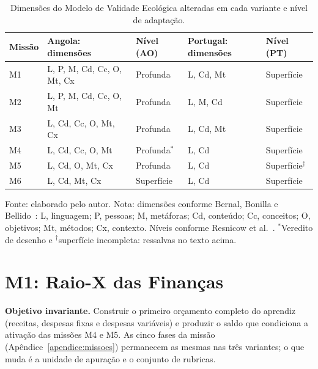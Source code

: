 \begin{table}[htbp]
\centering
\small
\caption[Vereditos de adaptação por missão]{Dimensões do Modelo de Validade Ecológica alteradas em cada variante e nível de adaptação.}
\label{tab:variantes_veredito}
\setlength{\tabcolsep}{4pt}
\begin{tabular}{lllll}
\hline
\textbf{Missão} & \textbf{Angola: dimensões} & \textbf{Nível (AO)} & \textbf{Portugal: dimensões} & \textbf{Nível (PT)} \\
\hline
M1 & L, P, M, Cd, Cc, O, Mt, Cx & Profunda & L, Cd, Mt & Superfície \\
M2 & L, P, M, Cd, Cc, O, Mt & Profunda & L, M, Cd & Superfície \\
M3 & L, Cd, Cc, O, Mt, Cx & Profunda & L, Cd, Mt & Superfície \\
M4 & L, Cd, Cc, O, Mt & Profunda$^{*}$ & L, Cd & Superfície \\
M5 & L, Cd, O, Mt, Cx & Profunda & L, Cd & Superfície$^{\dagger}$ \\
M6 & L, Cd, Mt, Cx & Superfície & L, Cd & Superfície \\
\hline
\end{tabular}

\begin{minipage}{0.92\textwidth}
{\footnotesize Fonte: elaborado pelo autor. Nota: dimensões conforme Bernal, Bonilla e Bellido~\cite{bernal1995}: L, linguagem; P, pessoas; M, metáforas; Cd, conteúdo; Cc, conceitos; O, objetivos; Mt, métodos; Cx, contexto. Níveis conforme Resnicow et al.~\cite{resnicow1999}. $^{*}$Veredito de desenho e $^{\dagger}$superfície incompleta: ressalvas no texto acima.}
\end{minipage}
\end{table}

\section*{M1: Raio-X das Finanças}

\noindent\textbf{Objetivo invariante.} Construir o primeiro orçamento completo do aprendiz (receitas, despesas fixas e despesas variáveis) e produzir o saldo que condiciona a ativação das missões M4 e M5. As cinco fases da missão (Apêndice~\ref{apendice:missoes}) permanecem as mesmas nas três variantes; o que muda é a unidade de apuração e o conjunto de rubricas.

